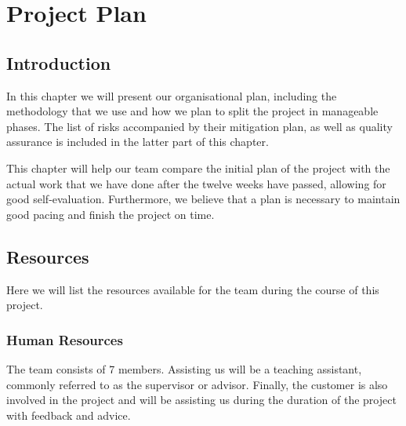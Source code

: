 \documentclass[../document.tex]{subfiles}
\begin{document}
\section{Project Plan}
\subsection{Introduction}
In this chapter we will present our organisational plan, including the methodology that we use and how we plan to split the project in manageable phases. The list of risks accompanied by their mitigation plan, as well as quality assurance is included in the latter part of this chapter.

This chapter will help our team compare the initial plan of the project with the actual work that we have done after the twelve weeks have passed, allowing for good self-evaluation. Furthermore, we believe that a plan is necessary to maintain good pacing and finish the project on time.

\subsection{Resources}
Here we will list the resources available for the team during the course of this project.

\subsubsection{Human Resources}
The team consists of 7 members. Assisting us will be a teaching assistant, commonly referred to as the supervisor or advisor. Finally, the customer is also involved in the project and will be assisting us during the duration of the project with feedback and advice.
\end{document}
